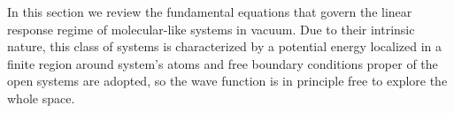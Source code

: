 \documentclass[reprint,aps,prb]{revtex4-1}
\newcommand{\be}{\begin{equation}}
\newcommand{\ee}{\end{equation}}
\newcommand{\lb}{\label}
\newcommand{\op}[1]{\hat {#1}}
\newcommand{\sop}[1]{\op{\op {#1}}}
\newcommand{\commutator}[2]{\left[ {#1} , {#2} \right]}
\newcommand{\trace}[1]{\mathrm{tr}\left(#1\right)}
\newcommand{\dmnot}{\op{\rho}_0}
\newcommand{\dm}{\op{\rho}}
\newcommand{\hnot}{\op{H}_0}
\newcommand{\Liouv}{\sop{\mathcal L}}
\begin{document}
% 

In this section we review the fundamental equations that govern the linear response regime of molecular-like systems in vacuum. Due to their intrinsic nature, this class of systems is 
characterized by a potential energy localized in a finite region around system's atoms and free boundary conditions proper of the open systems are adopted, so the wave function is in 
principle free to explore the whole space.  
\end{document}
